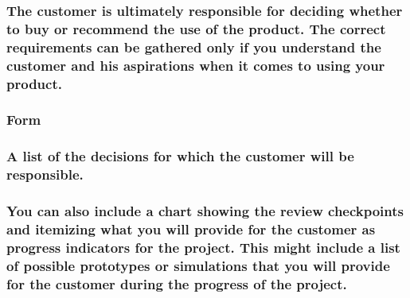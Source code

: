 \documentclass[
]{article}
\begin{document}
\hypertarget{the-customer-is-ultimately-responsible-for-deciding-whether-to-buy-or-recommend-the-use-of-the-product.-the-correct-requirements-can-be-gathered-only-if-you-understand-the-customer-and-his-aspirations-when-it-comes-to-using-your-product.}{%
\subsubsection{\texorpdfstring{The customer is ultimately responsible
for deciding whether to buy or recommend the use of the product. The
correct requirements can be gathered only if you understand the customer
and his aspirations when it comes to using your product.
}{The customer is ultimately responsible for deciding whether to buy or recommend the use of the product. The correct requirements can be gathered only if you understand the customer and his aspirations when it comes to using your product. }}\label{the-customer-is-ultimately-responsible-for-deciding-whether-to-buy-or-recommend-the-use-of-the-product.-the-correct-requirements-can-be-gathered-only-if-you-understand-the-customer-and-his-aspirations-when-it-comes-to-using-your-product.}}

\hypertarget{form-3}{%
\subsubsection{Form}\label{form-3}}

\hypertarget{a-list-of-the-decisions-for-which-the-customer-will-be-responsible.}{%
\subsubsection{\texorpdfstring{A list of the decisions for which the
customer will be responsible.
}{A list of the decisions for which the customer will be responsible. }}\label{a-list-of-the-decisions-for-which-the-customer-will-be-responsible.}}

\hypertarget{you-can-also-include-a-chart-showing-the-review-checkpoints-and-itemizing-what-you-will-provide-for-the-customer-as-progress-indicators-for-the-project.-this-might-include-a-list-of-possible-prototypes-or-simulations-that-you-will-provide-for-the-customer-during-the-progress-of-the-project.}{%
\subsubsection{You can also include a chart showing the review
checkpoints and itemizing what you will provide for the customer as
progress indicators for the project. This might include a list of
possible prototypes or simulations that you will provide for the
customer during the progress of the
project.}\label{you-can-also-include-a-chart-showing-the-review-checkpoints-and-itemizing-what-you-will-provide-for-the-customer-as-progress-indicators-for-the-project.-this-might-include-a-list-of-possible-prototypes-or-simulations-that-you-will-provide-for-the-customer-during-the-progress-of-the-project.}}
\end{document}
